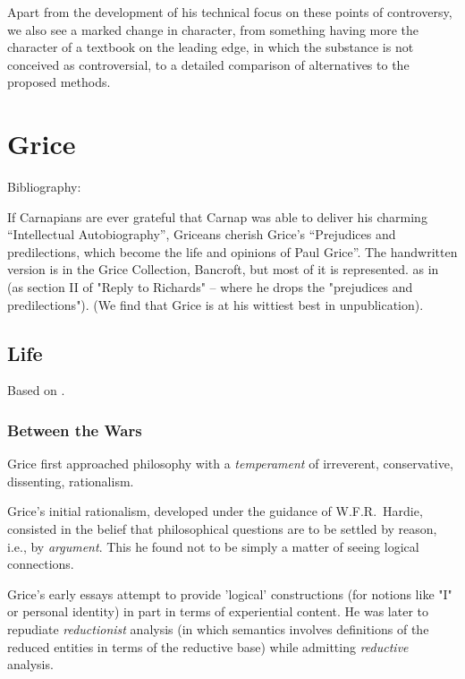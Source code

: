 \documentclass[10pt,titlepage]{book}
\begin{document}
Apart from the development of his technical focus on these points of controversy, we also see a marked change in character, from something having more the character of a textbook on the leading edge, in which the substance is not conceived as controversial, to a detailed comparison of alternatives to the proposed methods.

\chapter{Grice}

Bibliography:
\cite{grice41}
\cite{grice86}
\cite{grice86a}
\cite{grice87}
\cite{grice88}
\cite{grice89}
\cite{grice91}
\cite{grice01}
\cite{grice57}
\cite{pears57}
\cite{speranza89}
\cite{speranza91a}
\cite{speranza91b}
\cite{speranza95}

If Carnapians are ever grateful that Carnap was able to deliver his charming ``Intellectual Autobiography'', Griceans cherish Grice's ``Prejudices and predilections, which become the life and opinions of Paul Grice''\cite{grice86c}.
The handwritten version is in the Grice Collection, Bancroft, but most of it is represented. as \cite{grice86c} in \cite{grice86a} (as section II of "Reply to Richards" -- where he drops the "prejudices and predilections").
(We find that Grice is at his wittiest best in unpublication).

\section{Life}

Based on \cite{grice86c}.

\subsection{Between the Wars}

Grice first approached philosophy with a \emph{temperament} of irreverent, conservative, dissenting, rationalism.

Grice's initial rationalism, developed under the guidance of W.F.R.~Hardie, consisted in the belief that philosophical questions are to be settled by reason, i.e., by \emph{argument}.
This he found not to be simply a matter of seeing logical connections.

Grice's early essays attempt to provide 'logical' constructions (for notions like "I" or  personal identity) in part in terms of experiential content.
He was later to repudiate \emph{reductionist} analysis (in which semantics involves definitions of the reduced entities in terms of the reductive base) while admitting \emph{reductive} analysis. 
\end{document}
